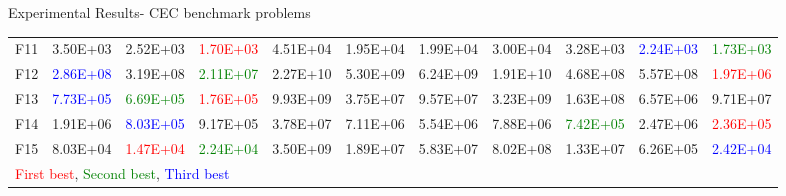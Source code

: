 \documentclass [9pt,times] {beamer}
\begin{document}
\begin{frame}{Experimental Results- CEC benchmark problems }
\begin{center}
\begin{tabular}{p{0.08in}  p{0.25in} |  p{0.23in} |  p{0.25in}|  p{0.25in} |  p{0.25in} | p{0.25in} |  p{0.25in} | p{0.25in} |  p{0.25in} |  p{0.25in}}
F11	&	3.50E+03	&	2.52E+03	&\textcolor{red}{	1.70E+03	}&	4.51E+04	&	1.95E+04	&	1.99E+04	&	3.00E+04	&	3.28E+03	&\textcolor{blue}{	2.24E+03	}&\textcolor{green}{	1.73E+03	}\\
F12	&\textcolor{blue}{	2.86E+08	}&	3.19E+08	&\textcolor{green}{	2.11E+07	}&	2.27E+10	&	5.30E+09	&	6.24E+09	&	1.91E+10	&	4.68E+08	&	5.57E+08	&\textcolor{red}{	1.97E+06	}\\
F13	&\textcolor{blue}{	7.73E+05	}&\textcolor{green}{	6.69E+05	}&\textcolor{red}{	1.76E+05	}&	9.93E+09	&	3.75E+07	&	9.57E+07	&	3.23E+09	&	1.63E+08	&	6.57E+06	&	9.71E+07	\\
F14	&	1.91E+06	&\textcolor{blue}{	8.03E+05	}&	9.17E+05	&	3.78E+07	&	7.11E+06	&	5.54E+06	&	7.88E+06	&\textcolor{green}{	7.42E+05	}&	2.47E+06	&\textcolor{red}{	2.36E+05	}\\
F15	&	8.03E+04	&\textcolor{red}{	1.47E+04	}&\textcolor{green}{	2.24E+04	}&	3.50E+09	&	1.89E+07	&	5.83E+07	&	8.02E+08	&	1.33E+07	&	6.26E+05	&\textcolor{blue}{	2.42E+04	}\\




\hline
\multicolumn{11}{l}{\textcolor{red}{First best}, \textcolor{green}{Second best}, \textcolor{blue}{Third best}}\\
\end{tabular}
\end{center}
   
\end{frame}
  
\end{document}
